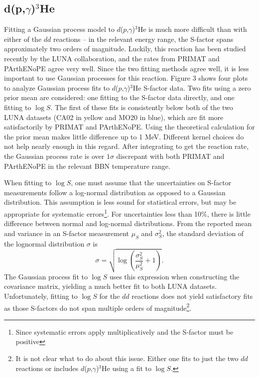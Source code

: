 \documentclass[%
 reprint,
superscriptaddress,
nofootinbib,
 amsmath,amssymb,
 aps,
 pra,
]{revtex4-2}
\begin{document}
\subsection{d(p,$\gamma$)$^3$He}

Fitting a Gaussian process model to $d$($p$,$\gamma$)$^3$He is much more difficult than with either of the $dd$ reactions -- in the relevant energy range, the S-factor spans approximately two orders of magnitude. Luckily, this reaction has been studied recently by the LUNA collaboration, and the rates from PRIMAT and PArthENoPE agree very well. Since the two fitting methods agree well, it is less important to use Gaussian processes for this reaction. Figure 3 shows four plots to analyze Gaussian process fits to $d$($p$,$\gamma$)$^3$He S-factor data. Two fits using a zero prior mean are considered: one fitting to the S-factor data directly, and one fitting to $\log S$. The first of these fits is consistently below both of the two LUNA datasets (CA02 in yellow and MO20 in blue), which are fit more satisfactorily by PRIMAT and PArthENoPE. Using the theoretical calculation for the prior mean makes little difference up to 1 MeV. Different kernel choices do not help nearly enough in this regard. After integrating to get the reaction rate, the Gaussian process rate is over $1\sigma$ discrepant with both PRIMAT and PArthENoPE in the relevant BBN temperature range. 

When fitting to $\log S$, one must assume that the uncertainties on S-factor measurements follow a log-normal distribution as opposed to a Gaussian distribution. This assumption is less sound for statistical errors, but may be appropriate for systematic errors\footnote{Since systematic errors apply multiplicatively and the S-factor must be positive}. For uncertainties less than 10\%, there is little difference between normal and log-normal distributions. From the reported mean and variance in an S-factor measurement $\mu_S$ and $\sigma_S^2$, the standard deviation of the lognormal distribution $\sigma$ is 
\begin{equation}
	\sigma = \sqrt{\log \left(\frac{\sigma_S^2}{\mu_S^2} + 1 \right)}. \nonumber
\end{equation}	
The Gaussian process fit to $\log S$ uses this expression when constructing the covariance matrix, yielding a much better fit to both LUNA datasets. Unfortunately, fitting to $\log S$ for the $dd$ reactions does not yield satisfactory fits as those S-factors do not span multiple orders of magnitude\footnote{It is not clear what to do about this issue. Either one fits to just the two $dd$ reactions or includes $d$($p$,$\gamma$)$^3$He using a fit to $\log S$.}. 
\end{document}
